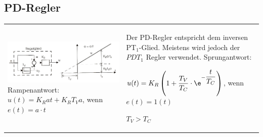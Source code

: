     

	\subsection{PD-Regler}
    \begin{tabular}{m{10cm}m{8cm}}
      {
        \includegraphics[width=10cm]{./images/PD_Regler.png}     \newline 
        Rampenantwort: $u(t) = K_R at+K_R T_V a$, wenn $ e(t) = a\cdot t$
      }&
      {
        Der PD-Regler entspricht dem inversen PT$_1$-Glied. Meistens wird jedoch
        der $PDT_1$ Regler verwendet.\newline
        Sprungantwort: \parbox{5cm}{$u(t) = K_R \left(1+\dfrac{T_V}{T_C}\cdot \e^{-\dfrac{t}{T_C}}\right)$, wenn $e(t) = 1(t)$} \newline
         \quad $T_V > T_C$
      }
    \end{tabular}
 


